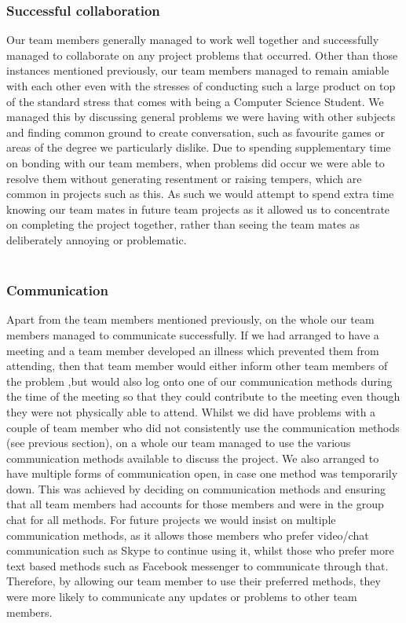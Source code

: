 \subsubsection{Successful collaboration}
Our team members generally managed to work well together and successfully managed to collaborate on any project problems that occurred. Other than those instances mentioned previously, our team members managed to remain amiable with each other even with the stresses of conducting such a large product on top of the standard stress that comes with being a Computer Science Student. We managed this by discussing general problems we were having with other subjects and finding common ground to create conversation, such as favourite games or areas of the degree we particularly dislike. Due to spending supplementary time on bonding with our team members, when problems did occur we were able to resolve them without generating resentment or raising tempers, which are common in projects such as this. As such we would attempt to spend extra time knowing our team mates in future team projects as it allowed us to concentrate on completing the project together, rather than seeing the team mates as deliberately annoying or problematic.\\
\\
\subsubsection{Communication}
Apart from the team members mentioned previously, on the whole our team members managed to communicate successfully. If we had arranged to have a meeting and a team member developed an illness which prevented them from attending, then that team member would either inform other team members of the problem ,but would also log onto one of our communication methods during the time of the meeting so that they could contribute to the meeting even though they were not physically able to attend. Whilst we did have problems with a couple of team member who did not consistently use the communication methods (see previous section), on a whole our team managed to use the various communication methods available to discuss the project. We also arranged to have multiple forms of communication open, in case one method was temporarily down. This was achieved by deciding on communication methods and ensuring that all team members had accounts for those members and were in the group chat for all methods. For future projects we would insist on multiple communication methods, as it allows those members who prefer video/chat communication such as Skype to continue using it, whilst those who prefer more text based methods such as Facebook messenger to communicate through that. Therefore, by allowing our team member to use their preferred methods, they were more likely to communicate any updates or problems to other team members. 

